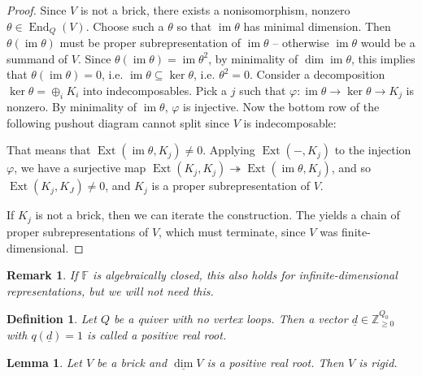 \documentclass{book}
\newtheorem{lemma}[theorem]{Lemma}
\newtheorem{definition}[theorem]{Definition}
\newtheorem{remark}[theorem]{Remark}
\newcommand{\defterm}{\emph}
\DeclareMathOperator{\im}{im}
\DeclareMathOperator{\End}{End}
\DeclareMathOperator{\Ext}{Ext}
\begin{document}
\begin{proof}
Since $V$ is not a brick, there exists a nonisomorphism, nonzero $\theta \in \End_Q(V)$. Choose such a $\theta$ so that $\im \theta$ has minimal dimension. Then $\theta(\im \theta)$ must be  proper subrepresentation of $\im \theta$ -- otherwise $\im \theta$ would be a summand of $V$. Since $\theta(\im \theta) = \im \theta^2$, by minimality of $\dim \im \theta$, this implies that $\theta(\im \theta) = 0$, i.e. $\im \theta \subseteq \ker \theta$, i.e. $\theta^2 = 0$. Consider a decomposition $\ker \theta = \oplus_i K_i$ into indecomposables. Pick a $j$ such that $\varphi: \im \theta \to \ker \theta \to K_j$ is nonzero. By minimality of $\im \theta$, $\varphi$ is injective. Now the bottom row of the following pushout diagram cannot split since $V$ is indecomposable:


That means that $\Ext(\im \theta, K_j) \neq 0$. Applying $\Ext(-,K_j)$ to the injection $\varphi$, we have a surjective map $\Ext(K_j, K_j) \twoheadrightarrow \Ext(\im \theta, K_j)$, and so $\Ext(K_j, K_J) \neq 0$, and $K_j$ is a proper subrepresentation of $V$.

If $K_j$ is not a brick, then we can iterate the construction. The yields a chain of proper subrepresentations of $V$, which must terminate, since $V$ was finite-dimensional.
\end{proof}

\begin{remark}
If $\mathbb{F}$ is algebraically closed, this also holds for infinite-dimensional representations, but we will not need this.
\end{remark} 

\begin{definition}
Let $Q$ be a quiver with no vertex loops. Then a vector $\underline d \in \mathbb Z_{\geq 0}^{Q_0}$ with $q(\underline d) = 1$ is called a \defterm{positive real root}.
\end{definition} 

\begin{lemma}
Let $V$ be a brick and $\underline{\dim} V$ is a positive real root. Then $V$ is rigid.
\end{lemma} 
\end{document}
